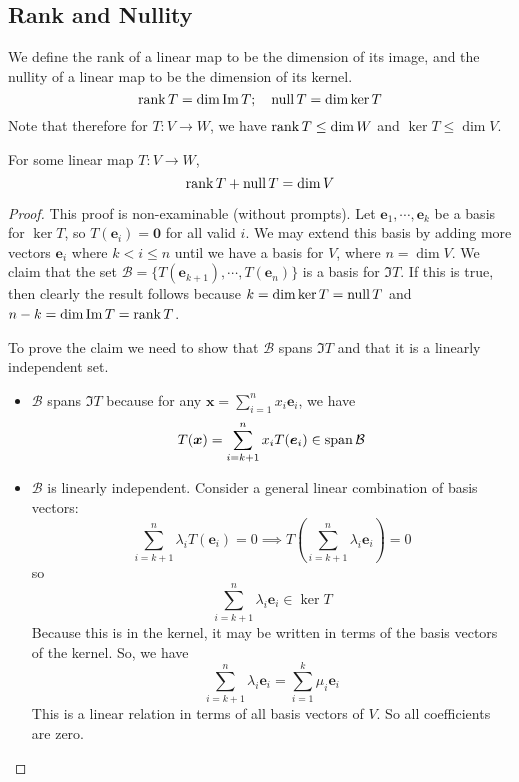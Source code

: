 \documentclass{article}
\begin{document}
\subsection{Rank and Nullity}
We define the rank of a linear map to be the dimension of its image, and the nullity of a linear map to be the dimension of its kernel.
\[ \rank T = \dim \Im T; \quad \operatorname{null} T = \dim \ker T \]
Note that therefore for $T: V \to W$, we have $\rank T \leq \dim W$ and $\ker T \leq \dim V$.
\begin{theorem}
	For some linear map $T: V \to W$,
	\[ \rank T + \operatorname{null} T = \dim V \]
\end{theorem}
\begin{proof}
	This proof is non-examinable (without prompts). Let $\bm e_1, \cdots, \bm e_k$ be a basis for $\ker T$, so $T(\bm e_i) = \bm 0$ for all valid $i$. We may extend this basis by adding more vectors $\bm e_i$ where $k < i \leq n$ until we have a basis for $V$, where $n=\dim V$. We claim that the set $\mathcal B = \{ T(\bm e_{k+1}), \cdots, T(\bm e_n) \}$ is a basis for $\Im T$. If this is true, then clearly the result follows because $k = \dim \ker T = \operatorname{null} T$ and $n-k = \dim \Im T = \rank T$.

	To prove the claim we need to show that $\mathcal B$ spans $\Im T$ and that it is a linearly independent set.
	\begin{itemize}
		\item $\mathcal B$ spans $\Im T$ because for any $\bm x = \sum_{i=1}^n x_i \bm e_i$, we have
		      \[ T(\bm x) = \sum_{i=k+1}^n x_i T(\bm e_i) \in \operatorname{span} \mathcal B \]
		\item $\mathcal B$ is linearly independent. Consider a general linear combination of basis vectors:
		      \[ \sum_{i=k+1}^n \lambda_i T(\bm e_i) = 0 \implies T\left( \sum_{i=k+1}^n \lambda_i \bm e_i \right) = 0 \]
		      so
		      \[ \sum_{i=k+1}^n \lambda_i \bm e_i \in \ker T \]
		      Because this is in the kernel, it may be written in terms of the basis vectors of the kernel. So, we have
		      \[ \sum_{i=k+1}^n \lambda_i \bm e_i = \sum_{i=1}^k \mu_i \bm e_i \]
		      This is a linear relation in terms of all basis vectors of $V$. So all coefficients are zero.
	\end{itemize}
\end{proof}
\end{document}
